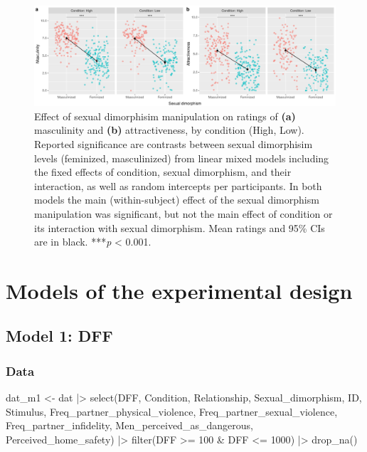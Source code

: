 \documentclass[
  bookmarksnumbered]{article}
\newenvironment{Shaded}{\begin{snugshade}}{\end{snugshade}}
\newcommand{\DecValTok}[1]{\textcolor[rgb]{0.86,0.86,0.80}{#1}}
\newcommand{\FunctionTok}[1]{\textcolor[rgb]{0.94,0.94,0.56}{#1}}
\newcommand{\NormalTok}[1]{\textcolor[rgb]{0.80,0.80,0.80}{#1}}
\newcommand{\OtherTok}[1]{\textcolor[rgb]{0.94,0.94,0.56}{#1}}
\newcommand{\SpecialCharTok}[1]{\textcolor[rgb]{0.86,0.64,0.64}{#1}}
\begin{document}
\begin{figure}
\centering
\includegraphics{Supplementary_material_files/figure-latex/sex-dimor-check-plot-1.pdf}
\caption{\label{fig:sex-dimor-check-plot}Effect of sexual dimorphisim manipulation on ratings of \textbf{(a)} masculinity and \textbf{(b)} attractiveness, by condition (High, Low). Reported significance are contrasts between sexual dimorphisim levels (feminized, masculinized) from linear mixed models including the fixed effects of condition, sexual dimorphism, and their interaction, as well as random intercepts per participants. In both models the main (within-subject) effect of the sexual dimorphism manipulation was significant, but not the main effect of condition or its interaction with sexual dimorphism. Mean ratings and 95\% CIs are in black. ***\textit{p} \textless{} 0.001.}
\end{figure}

\section{Models of the experimental design}\label{models-of-the-experimental-design}

\subsection{Model 1: DFF}\label{model-1-dff}

\subsubsection{Data}\label{data}

\begin{Shaded}
\begin{Highlighting}[]
\NormalTok{dat\_m1 }\OtherTok{\textless{}{-}}\NormalTok{ dat }\SpecialCharTok{|\textgreater{}} 
  \FunctionTok{select}\NormalTok{(DFF, Condition, Relationship, Sexual\_dimorphism,}
\NormalTok{         ID, Stimulus,}
\NormalTok{         Freq\_partner\_physical\_violence, Freq\_partner\_sexual\_violence,}
\NormalTok{         Freq\_partner\_infidelity, Men\_perceived\_as\_dangerous,}
\NormalTok{         Perceived\_home\_safety) }\SpecialCharTok{|\textgreater{}} 
  \FunctionTok{filter}\NormalTok{(DFF }\SpecialCharTok{\textgreater{}=} \DecValTok{100} \SpecialCharTok{\&}\NormalTok{ DFF }\SpecialCharTok{\textless{}=} \DecValTok{1000}\NormalTok{) }\SpecialCharTok{|\textgreater{}} 
  \FunctionTok{drop\_na}\NormalTok{()}
\end{Highlighting}
\end{Shaded}
\end{document}
